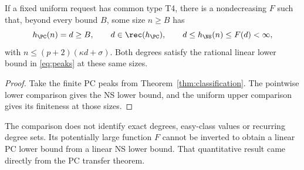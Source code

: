 \begin{corollary}\label{cor:common-peaks}
If a fixed uniform request has common type T4, there is a nondecreasing
$F$ such that, beyond every bound $B$, some size $n\ge B$ has
\[
 h_{\PC}(n)=d\ge B,\qquad d\in\rec(h_{\PC}),\qquad
 d\le h_{\NS}(n)\le F(d)<\infty,
\]
with $n\le(p+2)(\kappa d+\sigma)$. Both degrees satisfy the rational
linear lower bound in \eqref{eq:peaks} at these same sizes.
\end{corollary}
\begin{proof}
Take the finite PC peaks from Theorem~\ref{thm:classification}.
The pointwise lower comparison gives the NS lower bound, and the uniform
upper comparison gives its finiteness at those sizes.
\end{proof}

The comparison does not identify exact degrees, easy-class values or
recurring degree sets. Its potentially large function $F$ cannot be
inverted to obtain a linear PC lower bound from a linear NS lower bound.
That quantitative result came directly from the PC transfer theorem.
